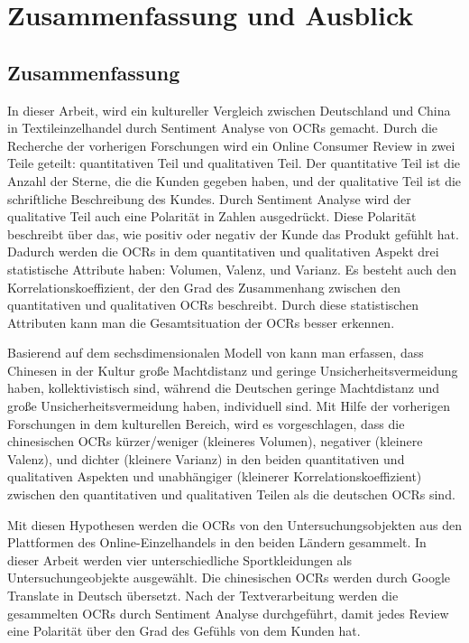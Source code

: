 \chapter{Zusammenfassung und Ausblick}
\section{Zusammenfassung}
In dieser Arbeit, wird ein kultureller Vergleich zwischen Deutschland und China in Textileinzelhandel durch Sentiment Analyse von \acl{OCRs} gemacht. Durch die Recherche der vorherigen Forschungen wird ein Online Consumer Review in zwei Teile geteilt: quantitativen Teil und qualitativen Teil. Der quantitative Teil ist die Anzahl der Sterne, die die Kunden gegeben haben, und der qualitative Teil ist die schriftliche Beschreibung des Kundes. Durch Sentiment Analyse wird der qualitative Teil auch eine Polarität in Zahlen ausgedrückt. Diese Polarität beschreibt über das, wie positiv oder negativ der Kunde das Produkt gefühlt hat. Dadurch werden die \ac{OCRs} in dem quantitativen und qualitativen Aspekt drei statistische Attribute haben: Volumen, Valenz, und Varianz. Es besteht auch den Korrelationskoeffizient, der den Grad des Zusammenhang zwischen den quantitativen und qualitativen \ac{OCRs} beschreibt. Durch diese statistischen Attributen kann man die Gesamtsituation der \ac{OCRs} besser erkennen.

Basierend auf dem sechsdimensionalen Modell von \citeauthor{hofstede2013interkulturelle} kann man erfassen, dass Chinesen in der Kultur große Machtdistanz und geringe Unsicherheitsvermeidung haben, kollektivistisch sind, während die Deutschen geringe Machtdistanz und große Unsicherheitsvermeidung haben, individuell sind. Mit Hilfe der vorherigen Forschungen in dem kulturellen Bereich, wird es vorgeschlagen, dass die chinesischen \ac{OCRs} kürzer/weniger (kleineres Volumen), negativer (kleinere Valenz), und dichter (kleinere Varianz) in den beiden quantitativen und qualitativen Aspekten und unabhängiger (kleinerer Korrelationskoeffizient) zwischen den quantitativen und qualitativen Teilen als die deutschen \ac{OCRs} sind.

Mit diesen Hypothesen werden die \ac{OCRs} von den Untersuchungsobjekten aus den Plattformen des Online-Einzelhandels in den beiden Ländern gesammelt. In dieser Arbeit werden vier unterschiedliche Sportkleidungen als Untersuchungeobjekte ausgewählt. Die chinesischen \ac{OCRs} werden durch Google Translate in Deutsch übersetzt. Nach der Textverarbeitung werden die gesammelten \ac{OCRs} durch Sentiment Analyse durchgeführt, damit jedes Review eine Polarität über den Grad des Gefühls von dem Kunden hat. 

